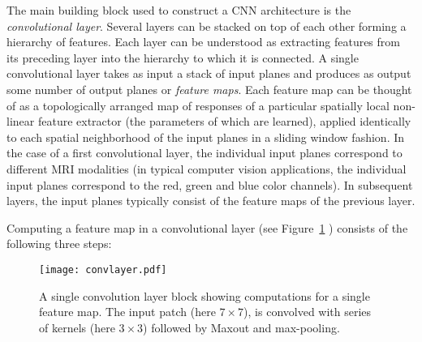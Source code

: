 \documentclass[final,5p,times,twocolumn]{elsarticle}
\begin{document}
The main building block used to construct a CNN architecture is the {\it convolutional layer}. Several layers can be stacked on top of each other forming a hierarchy of features. Each layer can be understood as extracting features from its preceding layer into the hierarchy to which it is connected. A single convolutional layer takes as input a stack of input planes and produces as output some number of output planes or \textit{feature maps}. Each feature map can be thought of as a topologically arranged map of responses of a particular spatially local non-linear feature extractor (the parameters of which are learned), applied identically to each spatial neighborhood of the input planes in a sliding window fashion.  In the case of a first convolutional layer, the individual input planes correspond to different MRI modalities (in typical computer vision applications, the individual input planes correspond to the red, green and blue color channels). In subsequent layers, the input planes typically consist of the feature maps of the previous layer.

Computing a feature map in a convolutional layer (see Figure~\ref{fig::convlayer} ) consists of the following three steps:


\begin{figure}

\centering

\texttt{[image: convlayer.pdf]}

\caption{A single convolution layer block showing computations for a single feature map. The input patch (here $7 \times 7$), is convolved with series of kernels (here $3 \times 3$) followed by Maxout and max-pooling. }

\label{fig::convlayer}
\end{figure}
\end{document}
